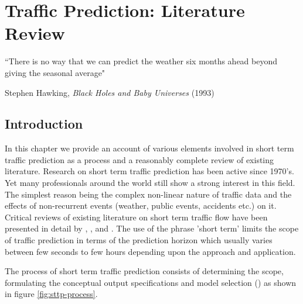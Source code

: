 
\chapter{Traffic Prediction: Literature Review}

\label{Chapter2}


{``There is no way that we can predict the weather six months ahead beyond giving the seasonal
average"}
\begin{flushright}
Stephen Hawking, \textit{Black Holes and Baby Universes} (1993)
\end{flushright}

\section{Introduction}
In this chapter we provide an account of various elements involved in short term traffic prediction
as a process and a reasonably complete review of existing literature. Research on short term traffic
prediction has been active since 1970's. Yet many professionals around the
world still show a strong interest in this field.
The simplest reason being the complex non-linear nature of traffic data and the effects of
non-recurrent events (weather, public events, accidents etc.) on it.  Critical reviews of existing
literature on short term traffic flow have been presented in detail by \citet{smith1997traffic},
\citet{vlahogianni2004short}, \citet{van2012short} and \citet{vlahogianni2014short}. The use of
the phrase 'short term' limits the scope of traffic prediction in terms of the prediction horizon
which usually varies between few seconds to few hours depending upon the approach and application.

The process of short term traffic prediction consists of determining the scope, formulating the
conceptual output specifications and model selection (\citet{vlahogianni2004short}) as shown in
figure \ref{fig:sttp-process}.

